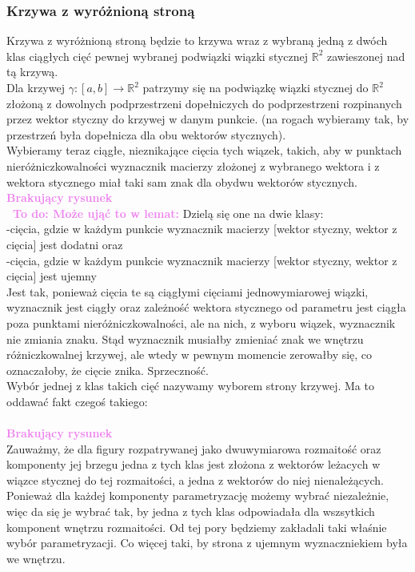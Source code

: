 \documentclass[a4paper, 12pt]{article}
\newcommand{\smalltodoII}[1]{\hfill \break \textbf{\ \textcolor{violet}{To do: #1}}\hfill \break}
\newcommand{\rysunek}[1]{\hfill \break\\[16pt] \Huge \textbf{\textcolor{violet}{Brakujący rysunek \normalsize
#1}} \hfill
\break \\[16pt] \normalsize}
\begin{document}
\subsubsection{Krzywa z wyróżnioną stroną}
Krzywa z wyróżnioną stroną będzie to krzywa wraz z wybraną jedną z dwóch klas ciągłych cięć pewnej wybranej
 podwiązki wiązki stycznej $\mathbb{R}^2$ zawieszonej nad tą krzywą. \\
Dla krzywej $\gamma : [a, b] \to \mathbb{R}^2$ patrzymy się na podwiązkę wiązki stycznej do
$\mathbb{R}^2$ złożoną
z dowolnych podprzestrzeni dopełniczych do podprzestrzeni rozpinanych przez wektor styczny do krzywej w
danym punkcie. (na rogach wybieramy tak, by przestrzeń była dopełnicza dla obu wektorów stycznych). \\
Wybieramy teraz ciągłe, nieznikające cięcia tych wiązek, takich, aby w punktach nieróżniczkowalności
wyznacznik macierzy złożonej z wybranego wektora i z wektora stycznego miał taki sam znak dla obydwu
wektorów stycznych.
\rysunek{}
\smalltodoII{Może ująć to w lemat:}
Dzielą się one na dwie klasy: \\
-cięcia, gdzie w każdym punkcie wyznacznik macierzy [wektor styczny, wektor z cięcia] jest dodatni oraz\\
-cięcia, gdzie w każdym punkcie wyznacznik macierzy [wektor styczny, wektor z cięcia] jest ujemny \\
Jest tak, ponieważ cięcia te są ciągłymi cięciami jednowymiarowej wiązki, wyznacznik jest ciągły oraz
zależność wektora stycznego od parametru jest ciągła poza punktami nieróżniczkowalności, ale na nich,
z wyboru wiązek, wyznacznik nie zmiania znaku. Stąd wyznacznik musiałby zmieniać znak we wnętrzu
różniczkowalnej krzywej, ale wtedy w pewnym momencie zerowałby się, co oznaczałoby, że cięcie znika.
Sprzeczność. \\
Wybór jednej z klas takich cięć nazywamy wyborem strony krzywej. Ma to oddawać fakt czegoś takiego: \\
\rysunek{}
Zauważmy, że dla figury rozpatrywanej jako dwuwymiarowa rozmaitość oraz komponenty jej brzegu jedna z tych
klas jest złożona z wektorów leżacych w wiązce stycznej do tej rozmaitości, a jedna z wektorów do niej
nienależących. Ponieważ dla każdej komponenty parametryzację możemy wybrać niezależnie, więc da się je wybrać
tak, by jedna z tych klas odpowiadała dla wszsytkich komponent wnętrzu rozmaitości. Od tej pory będziemy
zakładali taki właśnie wybór parametryzacji. Co więcej taki, by strona z ujemnym wyznaczniekiem była we
wnętrzu.
\\
\end{document}
